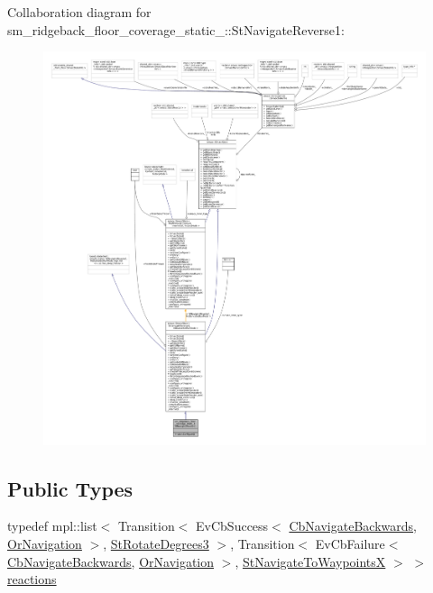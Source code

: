 Collaboration diagram for sm\+\_\+ridgeback\+\_\+floor\+\_\+coverage\+\_\+static\+\_\+:\+:St\+Navigate\+Reverse1\+:
\nopagebreak
\begin{figure}[H]
\begin{center}
\leavevmode
\includegraphics[width=350pt]{structsm__ridgeback__floor__coverage__static__1_1_1StNavigateReverse1__coll__graph}
\end{center}
\end{figure}
\subsection*{Public Types}
\begin{DoxyCompactItemize}
\item 
typedef mpl\+::list$<$ Transition$<$ Ev\+Cb\+Success$<$ \hyperlink{classcl__move__base__z_1_1CbNavigateBackwards}{Cb\+Navigate\+Backwards}, \hyperlink{classsm__ridgeback__floor__coverage__static__1_1_1OrNavigation}{Or\+Navigation} $>$, \hyperlink{structsm__ridgeback__floor__coverage__static__1_1_1StRotateDegrees3}{St\+Rotate\+Degrees3} $>$, Transition$<$ Ev\+Cb\+Failure$<$ \hyperlink{classcl__move__base__z_1_1CbNavigateBackwards}{Cb\+Navigate\+Backwards}, \hyperlink{classsm__ridgeback__floor__coverage__static__1_1_1OrNavigation}{Or\+Navigation} $>$, \hyperlink{structsm__ridgeback__floor__coverage__static__1_1_1StNavigateToWaypointsX}{St\+Navigate\+To\+WaypointsX} $>$ $>$ \hyperlink{structsm__ridgeback__floor__coverage__static__1_1_1StNavigateReverse1_a19065bdd460dc7dbf1859a30691425f2}{reactions}
\end{DoxyCompactItemize}
